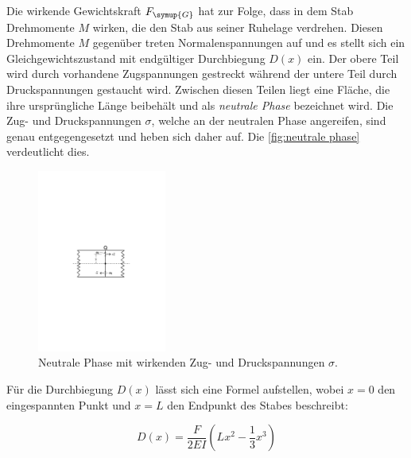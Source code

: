 Die wirkende Gewichtskraft $F_{\symup{G}}$ hat zur Folge, dass in dem Stab Drehmomente $M$ wirken, die den Stab aus seiner 
Ruhelage verdrehen. Diesen Drehmomente $M$ gegenüber treten Normalenspannungen auf und es stellt sich ein 
Gleichgewichtszustand mit endgültiger Durchbiegung $D(x)$ ein. Der obere Teil wird durch vorhandene Zugspannungen 
gestreckt während der untere Teil durch Druckspannungen gestaucht wird. Zwischen diesen Teilen liegt eine Fläche, die 
ihre ursprüngliche Länge beibehält und als \textit{neutrale Phase} bezeichnet wird. Die Zug- und Druckspannungen $\sigma$, 
welche an der neutralen Phase angereifen, sind genau entgegengesetzt und heben sich daher auf. 
Die \autoref{fig:neutrale phase} verdeutlicht dies.

\begin{figure} [H]
    \centering
    \includegraphics[height=6cm]{content/Abbildungen/neutrale_phase.pdf}
    \caption{Neutrale Phase mit wirkenden Zug- und Druckspannungen $\sigma$. \cite{v103}}
    \label{fig:neutrale phase}
\end{figure}


Für die Durchbiegung $D(x)$ lässt sich eine Formel aufstellen, wobei $x=0$ den eingespannten Punkt
und $x=L$ den Endpunkt des Stabes beschreibt:

\begin{equation}
    D(x)=\frac{F}{2EI}(Lx^{2}-\frac{1}{3}x^{3})
    \label{eq:Durchbiegung einseitig}
\end{equation}

